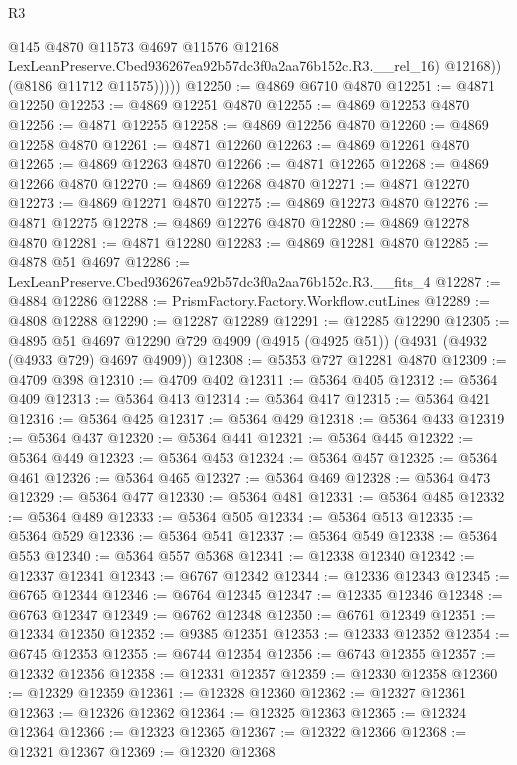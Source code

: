 \begin{lexlean}{R3}
\begin{coremodule}
                  @145
                  @4870
                  @11573
                  @4697
                  @11576
                  @12168
                  LexLeanPreserve.Cbed936267ea92b57dc3f0a2aa76b152c.R3.__rel_16)
                @12168))
            (@8186 @11712 @11575)))))
@12250 := @4869 @6710 @4870
@12251 := @4871 @12250
@12253 := @4869 @12251 @4870
@12255 := @4869 @12253 @4870
@12256 := @4871 @12255
@12258 := @4869 @12256 @4870
@12260 := @4869 @12258 @4870
@12261 := @4871 @12260
@12263 := @4869 @12261 @4870
@12265 := @4869 @12263 @4870
@12266 := @4871 @12265
@12268 := @4869 @12266 @4870
@12270 := @4869 @12268 @4870
@12271 := @4871 @12270
@12273 := @4869 @12271 @4870
@12275 := @4869 @12273 @4870
@12276 := @4871 @12275
@12278 := @4869 @12276 @4870
@12280 := @4869 @12278 @4870
@12281 := @4871 @12280
@12283 := @4869 @12281 @4870
@12285 := @4878 @51 @4697
@12286 := LexLeanPreserve.Cbed936267ea92b57dc3f0a2aa76b152c.R3.__fits_4
@12287 := @4884 @12286
@12288 := PrismFactory.Factory.Workflow.cutLines
@12289 := @4808 @12288
@12290 := @12287 @12289
@12291 := @12285 @12290
@12305 := @4895
    @51
    @4697
    @12290
    @729
    @4909
    (@4915 (@4925 @51))
    (@4931 (@4932 (@4933 @729) @4697 @4909))
@12308 := @5353 @727 @12281 @4870
@12309 := @4709 @398
@12310 := @4709 @402
@12311 := @5364 @405
@12312 := @5364 @409
@12313 := @5364 @413
@12314 := @5364 @417
@12315 := @5364 @421
@12316 := @5364 @425
@12317 := @5364 @429
@12318 := @5364 @433
@12319 := @5364 @437
@12320 := @5364 @441
@12321 := @5364 @445
@12322 := @5364 @449
@12323 := @5364 @453
@12324 := @5364 @457
@12325 := @5364 @461
@12326 := @5364 @465
@12327 := @5364 @469
@12328 := @5364 @473
@12329 := @5364 @477
@12330 := @5364 @481
@12331 := @5364 @485
@12332 := @5364 @489
@12333 := @5364 @505
@12334 := @5364 @513
@12335 := @5364 @529
@12336 := @5364 @541
@12337 := @5364 @549
@12338 := @5364 @553
@12340 := @5364 @557 @5368
@12341 := @12338 @12340
@12342 := @12337 @12341
@12343 := @6767 @12342
@12344 := @12336 @12343
@12345 := @6765 @12344
@12346 := @6764 @12345
@12347 := @12335 @12346
@12348 := @6763 @12347
@12349 := @6762 @12348
@12350 := @6761 @12349
@12351 := @12334 @12350
@12352 := @9385 @12351
@12353 := @12333 @12352
@12354 := @6745 @12353
@12355 := @6744 @12354
@12356 := @6743 @12355
@12357 := @12332 @12356
@12358 := @12331 @12357
@12359 := @12330 @12358
@12360 := @12329 @12359
@12361 := @12328 @12360
@12362 := @12327 @12361
@12363 := @12326 @12362
@12364 := @12325 @12363
@12365 := @12324 @12364
@12366 := @12323 @12365
@12367 := @12322 @12366
@12368 := @12321 @12367
@12369 := @12320 @12368

\end{coremodule}
\end{lexlean}
